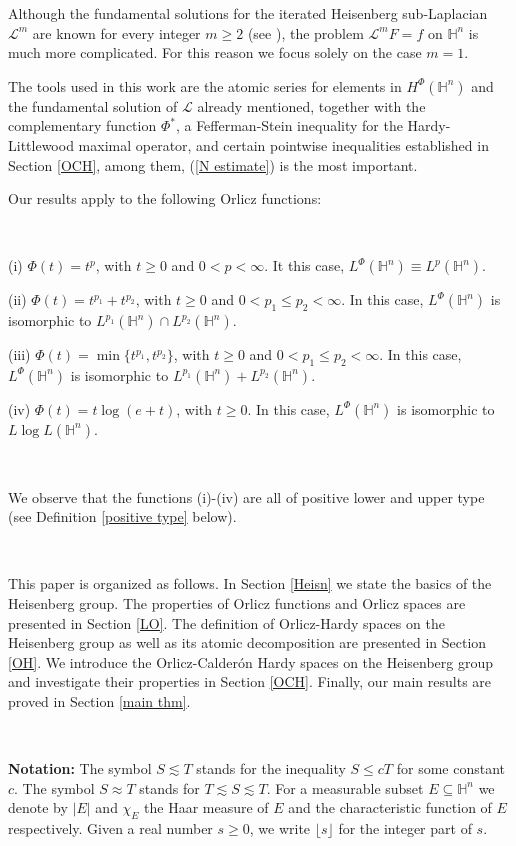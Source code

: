 \documentclass[oneside,10pt]{article}
\begin{document}
Although the fundamental solutions for the iterated Heisenberg sub-Laplacian $\mathcal{L}^m$ are known for every integer $m \geq 2$ 
(see \cite{Benson}), the problem $\mathcal{L}^m F = f$ on $\mathbb{H}^n$ is much more complicated. For this reason we focus solely on 
the case $m=1$.

The tools used in this work are the atomic series for elements in $H^{\Phi}(\mathbb{H}^n)$ and the fundamental solution of $\mathcal{L}$ already mentioned, together with the complementary function $\Phi^{*}$, a Fefferman-Stein inequality for the Hardy-Littlewood maximal 
operator, and certain pointwise inequalities established in Section \ref{OCH}, among them, (\ref{N estimate}) is the most important.

Our results apply to the following Orlicz functions:

\

(i) $\Phi(t) = t^p$, with $t \geq 0$ and $0 < p < \infty$. It this case, $L^{\Phi}(\mathbb{H}^n) \equiv L^{p}(\mathbb{H}^n)$.

(ii) $\Phi(t) = t^{p_1} + t^{p_2}$, with $t \geq 0$ and $0 < p_1 \leq p_2 < \infty$. In this case, $L^{\Phi}(\mathbb{H}^n)$ is isomorphic to 
$L^{p_1}(\mathbb{H}^n) \cap L^{p_2}(\mathbb{H}^n)$.

(iii) $\Phi(t) = \min \{ t^{p_1}, t^{p_2} \}$, with $t \geq 0$ and $0 < p_1 \leq p_2 < \infty$. In this case, $L^{\Phi}(\mathbb{H}^n)$ is isomorphic to $L^{p_1}(\mathbb{H}^n) + L^{p_2}(\mathbb{H}^n)$.

(iv) $\Phi(t) = t \log(e + t)$, with $t \geq 0$. In this case, $L^{\Phi}(\mathbb{H}^n)$ is isomorphic to $L \log L (\mathbb{H}^n)$.

\

We observe that the functions (i)-(iv) are all of positive lower and upper type (see Definition \ref{positive type} below). 

\

This paper is organized as follows. In Section \ref{Heisn} we state the basics of the Heisenberg group. The properties of Orlicz functions and Orlicz spaces are presented in Section \ref{LO}. The definition of Orlicz-Hardy spaces on the Heisenberg group as well as its atomic decomposition are presented in Section \ref{OH}. We introduce the Orlicz-Calder\'on Hardy spaces on the Heisenberg group and investigate their properties in Section \ref{OCH}. Finally, our main results are proved in Section \ref{main thm}.

\

\textbf{Notation:} The symbol $S \lesssim T$ stands for the inequality $S \leq c T$ for some constant $c$. The symbol $S \approx T$ 
stands for $T \lesssim S \lesssim T$. For a measurable subset $E\subseteq \mathbb{H}^{n}$ we denote by $\left\vert E\right\vert $ and 
$\chi_{E}$ the Haar measure of $E$ and the characteristic function of $E$ respectively. Given a real number $s \geq 0$, we write 
$\lfloor s \rfloor$ for the integer part of $s$.
\end{document}
